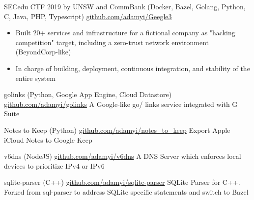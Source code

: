 \documentclass[hidelinks__VERSION__]{adamyi-cv}
\begin{document}
\begin{entrylist}


\entry
{SECedu CTF 2019 by UNSW and CommBank (Docker, Bazel, Golang, Python, C, Java, PHP, Typescript)}
{\href{https://github.com/adamyi/Geegle3}{github.com/adamyi/Geegle3}}
{
\begin{minipage}[t]{1\linewidth}
\begin{itemize}[leftmargin=*,align=left,noitemsep]
\item Built 20+ services and infrastructure for a fictional company as "hacking competition" target, including a zero-trust network environment (BeyondCorp-like)
\item In charge of building, deployment, continuous integration, and stability of the entire system
\end{itemize}
\end{minipage}
}


\entry
{golinks (Python, Google App Engine, Cloud Datastore)}
{\href{https://github.com/adamyi/golinks}{github.com/adamyi/golinks}}
{A Google-like go/ links service integrated with G Suite}


\entry
{Notes to Keep (Python)}
{\href{https://github.com/adamyi/notes_to_keep}{github.com/adamyi/notes\_to\_keep}}
{Export Apple iCloud Notes to Google Keep}


\entry
{v6dns (NodeJS)}
{\href{https://github.com/adamyi/v6dns}{github.com/adamyi/v6dns}}
{A DNS Server which enforces local devices to prioritize IPv4 or IPv6}


\entry
{sqlite-parser (C++)}
{\href{https://github.com/adamyi/sqlite-parser}{github.com/adamyi/sqlite-parser}}
{SQLite Parser for C++. Forked from sql-parser to address SQLite specific statements and switch to Bazel}


\end{entrylist}


\end{document}
